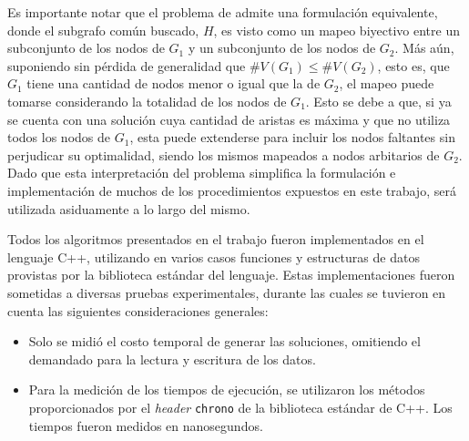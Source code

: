 Es importante notar que el problema de  admite una formulación
equivalente, donde el subgrafo común buscado, $H$, es visto como un mapeo
biyectivo entre un subconjunto de los nodos de $G_1$ y un subconjunto de los
nodos de $G_2$. Más aún, suponiendo sin pérdida de generalidad que $\#V(G_1)
\leq \#V(G_2)$, esto es, que $G_1$ tiene una cantidad de nodos menor o igual
que la de $G_2$, el mapeo puede tomarse considerando la totalidad de los nodos
de $G_1$. Esto se debe a que, si ya se cuenta con una solución cuya cantidad
de aristas es máxima y que no utiliza todos los nodos de $G_1$, esta puede
extenderse para incluir los nodos faltantes sin perjudicar su optimalidad,
siendo los mismos mapeados a nodos arbitarios de $G_2$. Dado que esta
interpretación del problema simplifica la formulación e implementación de
muchos de los procedimientos expuestos en este trabajo, será utilizada
asiduamente a lo largo del mismo.

Todos los algoritmos presentados en el trabajo fueron implementados en el
lenguaje C++, utilizando en varios casos funciones y estructuras de datos
provistas por la biblioteca estándar del lenguaje. Estas implementaciones
fueron sometidas a diversas pruebas experimentales, durante las
cuales se tuvieron en cuenta las siguientes consideraciones generales:

\begin{itemize}
\item Solo se midió el costo temporal de generar las soluciones,
omitiendo el demandado para la lectura y escritura de los datos.
\item Para la medición de los tiempos de ejecución, se utilizaron los
métodos proporcionados por el \emph{header} \texttt{chrono} de la
biblioteca estándar de C++. Los tiempos fueron medidos en nanosegundos.
\end{itemize}
